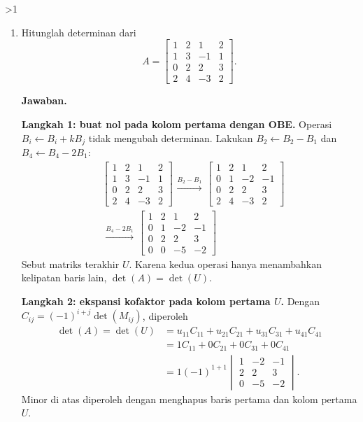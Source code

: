 \documentclass[12pt]{article}
\newcommand{\answername}{Jawaban}
\newenvironment{soaljawab}[1]{%
    \ifnum#1>1\clearpage\fi
    \begin{tcolorbox}[enhanced,breakable,height fill,height fixed for=all,
        sharp corners,colback=white,colframe=black,boxrule=0.4bp,
        boxsep=0pt,left=12bp,right=12bp,top=6bp,bottom=10bp,
        before skip=0pt,after skip=0pt,pad at break=8bp]
    \fontsize{12bp}{14bp}\selectfont
    \setlength{\abovedisplayskip}{8bp}
    \setlength{\belowdisplayskip}{8bp}
    \setlength{\abovedisplayshortskip}{8bp}
    \setlength{\belowdisplayshortskip}{8bp}
    \renewcommand{\arraystretch}{1.15}
    \begin{enumerate}[start=#1,topsep=0pt]
}{%
    \end{enumerate}
    \end{tcolorbox}
}
\newcommand{\jawaban}{\par\medskip\textbf{\answername.}\par\smallskip}
\begin{document}
\begin{soaljawab}{5}
\item Hitunglah determinan dari
        \[
          A = \begin{bmatrix}
            1 & 2 & 1  & 2 \\
            1 & 3 & -1 & 1 \\
            0 & 2 & 2  & 3 \\
            2 & 4 & -3 & 2
          \end{bmatrix}.
        \]
\jawaban
\textbf{Langkah 1: buat nol pada kolom pertama dengan OBE.}
Operasi $B_i\leftarrow B_i+kB_j$ tidak mengubah determinan.
Lakukan $B_2\leftarrow B_2-B_1$ dan $B_4\leftarrow B_4-2B_1$:
{\setlength{\arraycolsep}{4bp}
\begin{align*}
    & \left[\begin{array}{cccc}
            1 & 2 & 1 & 2 \\
            1 & 3 & -1 & 1 \\
            0 & 2 & 2 & 3 \\
            2 & 4 & -3 & 2
        \end{array}\right]
        \begin{array}{c}\xrightarrow{B_2-B_1}\end{array}
        \left[\begin{array}{cccc}
            1 & 2 & 1 & 2 \\
            0 & 1 & -2 & -1 \\
            0 & 2 & 2 & 3 \\
            2 & 4 & -3 & 2
        \end{array}\right] \\[6bp]
    & \begin{array}{c}\xrightarrow{B_4-2B_1}\end{array}
        \left[\begin{array}{cccc}
            1 & 2 & 1 & 2 \\
            0 & 1 & -2 & -1 \\
            0 & 2 & 2 & 3 \\
            0 & 0 & -5 & -2
        \end{array}\right]
\end{align*}}
Sebut matriks terakhir $U$. Karena kedua operasi hanya menambahkan kelipatan
baris lain, $\det(A)=\det(U)$.

\smallskip
\textbf{Langkah 2: ekspansi kofaktor pada kolom pertama $U$.}
Dengan $C_{ij}=(-1)^{i+j}\det(M_{ij})$, diperoleh
\begin{align*}
    \det(A)=\det(U)
    &=u_{11}C_{11}+u_{21}C_{21}+u_{31}C_{31}+u_{41}C_{41}\\
    &=1C_{11}+0C_{21}+0C_{31}+0C_{41}\\
    &=1(-1)^{1+1}\begin{vmatrix}
        1&-2&-1\\2&2&3\\0&-5&-2
      \end{vmatrix}.
\end{align*}
Minor di atas diperoleh dengan menghapus baris pertama dan kolom pertama $U$.


\end{soaljawab}
\end{document}
